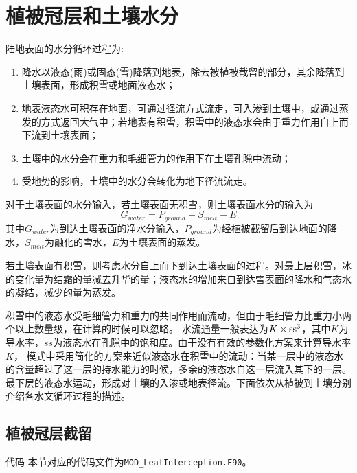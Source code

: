 \chapter{植被冠层和土壤水分}

陆地表面的水分循环过程为:
\begin{enumerate}
    \item 降水以液态(雨)或固态(雪)降落到地表，除去被植被截留的部分，其余降落到土壤表面，形成积雪或地面液态水；
    \item 地表液态水可积存在地面，可通过径流方式流走，可入渗到土壤中，或通过蒸发的方式返回大气中；若地表有积雪，积雪中的液态水会由于重力作用自上而下流到土壤表面；
    \item 土壤中的水分会在重力和毛细管力的作用下在土壤孔隙中流动；
    \item 受地势的影响，土壤中的水分会转化为地下径流流走。
\end{enumerate}

对于土壤表面的水分输入，若土壤表面无积雪，则土壤表面水分的输入为
\begin{equation}
G_{water}=P_{ground}+S_{melt}-E
\end{equation}
其中$G_{water}$为到达土壤表面的净水分输入，$P_{ground}$为经植被截留后到达地面的降水，$S_{melt}$为融化的雪水，$E$为土壤表面的蒸发。

若土壤表面有积雪，则考虑水分自上而下到达土壤表面的过程。对最上层积雪，冰的变化量为结霜的量减去升华的量；液态水的增加来自到达雪表面的降水和气态水的凝结，减少的量为蒸发。

积雪中的液态水受毛细管力和重力的共同作用而流动，但由于毛细管力比重力小两个以上数量级，在计算的时候可以忽略。
水流通量一般表达为$K\times{\rm ss}^3$，其中$K$为导水率，$ss$为液态水在孔隙中的饱和度。由于没有有效的参数化方案来计算导水率$K$，
模式中采用简化的方案来近似液态水在积雪中的流动：当某一层中的液态水的含量超过了这一层的持水能力的时候，多余的液态水自这一层流入其下的一层。
最下层的液态水运动，形成对土壤的入渗或地表径流。下面依次从植被到土壤分别介绍各水文循环过程的描述。


\section{植被冠层截留}\label{植被冠层截留}
\begin{mymdframed}{代码}
本节对应的代码文件为\texttt{MOD\_LeafInterception.F90}。
\end{mymdframed}

